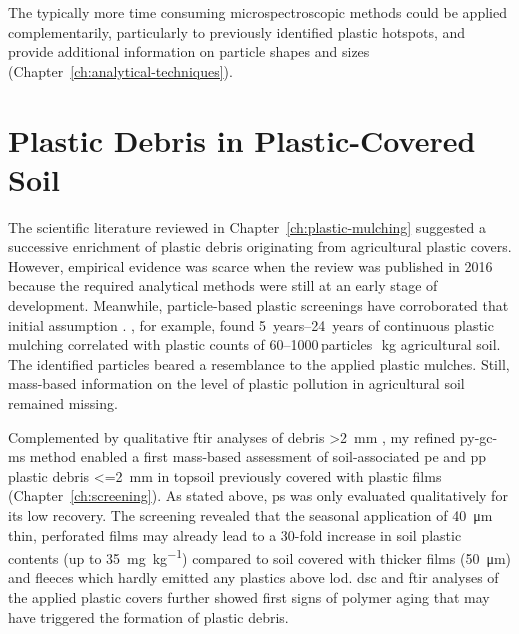 The typically more time consuming microspectroscopic methods could be applied complementarily, particularly to previously identified plastic hotspots, and provide additional information on particle shapes and sizes (Chapter~\ref{ch:analytical-techniques}).

\section{Plastic Debris in Plastic-Covered Soil}
\label{sec:general-discussion:screening}

The scientific literature reviewed in Chapter~\ref{ch:plastic-mulching} suggested a successive enrichment of plastic debris originating from agricultural plastic covers. However, empirical evidence was scarce when the review was published in 2016 because the required analytical methods were still at an early stage of development. Meanwhile, particle-based plastic screenings have corroborated that initial assumption \citep{HuangAgricultural2020,ZhouMicroplastics2020}. , for example, found \SIrange{5}{24}{years} of continuous plastic mulching correlated with plastic counts of \numrange{60}{1000}\,particles\,\si{\per\kilo\gram} agricultural soil. The identified particles beared a resemblance to the applied plastic mulches.
Still, mass-based information on the level of plastic pollution in agricultural soil remained missing.

Complemented by qualitative \ac{ftir} analyses of debris \SI{>2}{\milli\meter} \citep{CowgerMicroplastic2021}, my refined \ac{py-gc-ms} method enabled a first mass-based assessment of soil-associated \ac{pe} and \ac{pp} plastic debris \SI{<=2}{\milli\meter} in topsoil previously covered with plastic films (Chapter~\ref{ch:screening}). As stated above, \ac{ps} was only evaluated qualitatively for its low recovery.
The screening revealed that the seasonal application of \SI{40}{\micro\meter} thin, perforated films may already lead to a 30-fold increase in soil plastic contents (up to \SI{35}{\milli\gram\per\kilo\gram}) compared to soil covered with thicker films (\SI{50}{\micro\meter}) and fleeces which hardly emitted any plastics above \ac{lod}. \Ac{dsc} and \ac{ftir} analyses of the applied plastic covers further showed first signs of polymer aging that may have triggered the formation of plastic debris.

